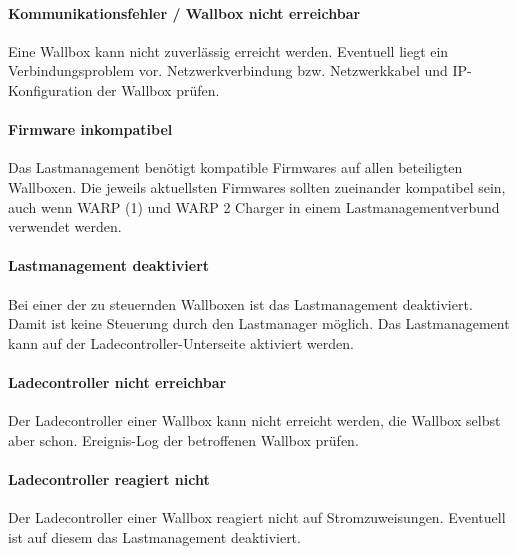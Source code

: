 \documentclass[a4paper,10pt]{article}
\begin{document}
\begin{multicols*}{2}
    \paragraph{Kommunikationsfehler / Wallbox nicht erreichbar}
    Eine Wallbox kann nicht zuverlässig erreicht werden. Eventuell liegt ein Verbindungsproblem vor. Netzwerkverbindung bzw. Netzwerkkabel und IP-Konfiguration der Wallbox prüfen.

    \paragraph{Firmware inkompatibel}
    Das Lastmanagement benötigt kompatible Firmwares auf allen beteiligten Wallboxen. Die jeweils aktuellsten Firmwares sollten zueinander kompatibel sein,
    auch wenn WARP (1) und WARP 2 Charger in einem Lastmanagementverbund verwendet werden.

    \paragraph{Lastmanagement deaktiviert}
    Bei einer der zu steuernden Wallboxen ist das Lastmanagement deaktiviert. Damit ist keine Steuerung durch den Lastmanager möglich. Das Lastmanagement kann auf der Ladecontroller-Unterseite aktiviert werden.

    \paragraph{Ladecontroller nicht erreichbar}
    Der Ladecontroller einer Wallbox kann nicht erreicht werden, die Wallbox selbst aber schon. Ereignis-Log der betroffenen Wallbox prüfen.

    \paragraph{Ladecontroller reagiert nicht}
    Der Ladecontroller einer Wallbox reagiert nicht auf Stromzuweisungen. Eventuell ist auf diesem das Lastmanagement deaktiviert.


\end{multicols*}
\end{document}
